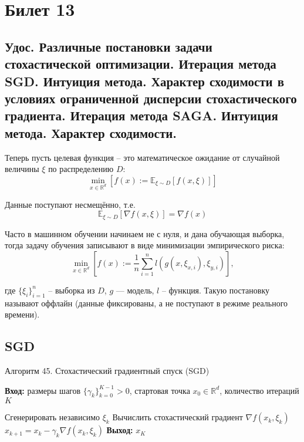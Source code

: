 \section{Билет 13}

\subsection{Удос. Различные постановки задачи стохастической оптимизации. Итерация метода SGD. Интуиция метода.
    Характер сходимости в условиях ограниченной дисперсии стохастического градиента. Итерация метода SAGA.
    Интуиция метода. Характер сходимости.}

Теперь пусть целевая функция – это математическое ожидание от случайной величины $\xi$ по распределению $D$:
$$\min_{x \in \mathbb{R}^d} \left[ f(x) := \mathbb{E}_{\xi \sim D}[f(x, \xi)] \right]$$

\begin{agreement}
    Данные поступают несмещённо, т.е.
    $$\mathbb{E}_{\xi \sim D}[\nabla f(x, \xi)] = \nabla f(x)$$
\end{agreement}

\begin{definition}
    Часто в машинном обучении начинаем не с нуля, и дана обучающая выборка, тогда задачу обучения записывают в виде минимизации эмпирического риска:
    $$\min_{x \in \mathbb{R}^d} \left[ f(x) := \frac{1}{n} \sum_{i=1}^{n} l(g(x, \xi_{x,i}), \xi_{y,i}) \right],$$

    где $\{\xi_i\}_{i=1}^n$ – выборка из $D$, $g$ –-- модель, $l$ – функция.
    Такую постановку называют оффлайн (данные фиксированы, а не поступают в режиме реального времени).
\end{definition}

\subsection*{SGD}

\begin{algorithm}[H]
    \caption{Алгоритм 45. Стохастический градиентный спуск (SGD)}
    \textbf{Вход:} размеры шагов $\{\gamma_k\}_{k=0}^{K-1} > 0$, стартовая точка $x_0 \in \mathbb{R}^d$, количество итераций $K$
    \begin{algorithmic}[1]
        \State Сгенерировать независимо $\xi_k$
        \State Вычислить стохастический градиент $\nabla f(x_k, \xi_k)$
        \State $x_{k+1} = x_k - \gamma_k \nabla f(x_k, \xi_k)$
        \EndFor
        \State \textbf{Выход:} $x_K$
    \end{algorithmic}
\end{algorithm}

